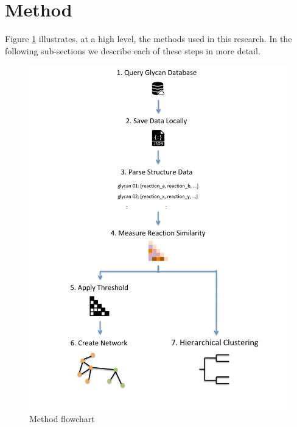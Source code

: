 \documentclass[12pt,a4paper]{article}
\begin{document}
\newpage
\section{Method}
\label{sec:method}

Figure \ref{fig:flowchart} illustrates, at a high level, the methods used in this research.
In the following sub-sections we describe each of these steps in more detail.

\begin{figure}
\centering 
\includegraphics[scale=0.83]{images/flowchart.pdf} 
\caption{Method flowchart}
\label{fig:flowchart}
\end{figure}
\end{document}
